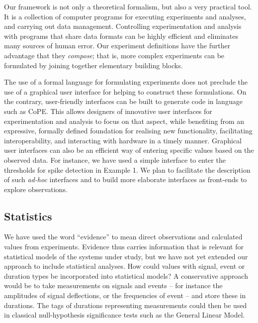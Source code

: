 Our framework is not only a theoretical formalism, but also a very
practical tool. It is a collection of computer programs for executing
experiments and analyses, and carrying out data
management. Controlling experimentation and analysis with programs
that share data formats can be highly efficient and eliminates
many sources of human error. Our experiment definitions have the
further advantage that they \emph{compose}; that is, more complex
experiments can be formulated by joining together elementary building
blocks. 

The use of a formal language for formulating experiments does not preclude the
use of a graphical user interface for helping to construct these formulations.
On the contrary, user-friendly interfaces can be built to generate
code in language such as CoPE. This allows designers of innovative user
interfaces for experimentation and analysis to focus on that aspect, while
benefiting from an expressive, formally defined foundation for
realising new functionality, facilitating interoperability, 
and interacting with hardware in a timely manner.
Graphical user interfaces can also be an efficient way of
entering specific values based on the observed data. For instance, we have
used a simple interface to enter the thresholds for spike detection in Example
1. We plan to facilitate the description of such \emph{ad-hoc} interfaces and
to build more elaborate interfaces as front-ends to explore observations.



\subsection*{Statistics}

We have used the word ``evidence'' to mean direct observations and
calculated values from experiments. Evidence thus carries information
that is relevant for statistical models of the systems under study,
but we have not yet extended our approach to include statistical
analyses. How could values with signal, event or duration types be
incorporated into statistical models? A conservative approach would be to
take measurements on signals and events -- for instance the amplitudes
of signal deflections, or the frequencies of event -- and store these in
durations. The tags of durations representing measurements could then
be used in classical null-hypothesis significance
tests such as the General Linear Model. 


